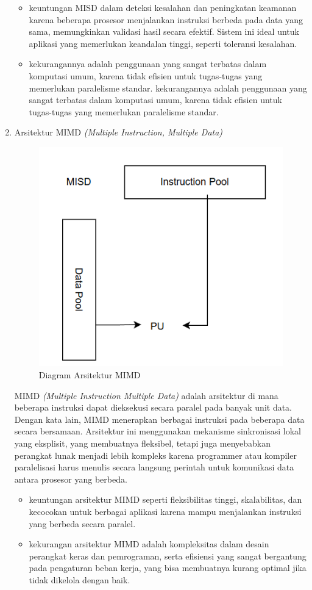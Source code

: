 \documentclass[12pt]{article}
\begin{document}
\begin{enumerate}
    \begin{itemize}
        \item keuntungan MISD dalam deteksi kesalahan dan peningkatan keamanan karena beberapa prosesor menjalankan instruksi berbeda pada data yang sama, memungkinkan validasi hasil secara efektif. Sistem ini ideal untuk aplikasi yang memerlukan keandalan tinggi, seperti toleransi kesalahan.
        \item kekurangannya adalah penggunaan yang sangat terbatas dalam komputasi umum, karena tidak efisien untuk tugas-tugas yang memerlukan paralelisme standar. kekurangannya adalah penggunaan yang sangat terbatas dalam komputasi umum, karena tidak efisien untuk tugas-tugas yang memerlukan paralelisme standar. 
    \end{itemize}
    \item Arsitektur MIMD \textit{(Multiple Instruction, Multiple Data)}

        \noindent
        \begin{figure}[H]
            \centering
            \includegraphics[width=0.4\linewidth]{asset/image8.png}
            \caption{Diagram Arsitektur MIMD}
            \label{fig:Diagram-Arsitektur-MIMD}
        \end{figure}
        
    MIMD \textit{(Multiple Instruction Multiple Data)} adalah arsitektur di mana beberapa instruksi dapat dieksekusi secara paralel pada banyak unit data. Dengan kata lain, MIMD menerapkan berbagai instruksi pada beberapa data secara bersamaan. Arsitektur ini menggunakan mekanisme sinkronisasi lokal yang eksplisit, yang membuatnya fleksibel, tetapi juga menyebabkan perangkat lunak menjadi lebih kompleks karena programmer atau kompiler paralelisasi harus menulis secara langsung perintah untuk komunikasi data antara prosesor yang berbeda.

    \begin{itemize}
    
        \item keuntungan arsitektur MIMD seperti fleksibilitas tinggi, skalabilitas, dan kecocokan untuk berbagai aplikasi karena mampu menjalankan instruksi yang berbeda secara paralel.

        \item kekurangan arsitektur MIMD adalah kompleksitas dalam desain perangkat keras dan pemrograman, serta efisiensi yang sangat bergantung pada pengaturan beban kerja, yang bisa membuatnya kurang optimal jika tidak dikelola dengan baik.
    \end{itemize}
\end{enumerate}
\end{document}
